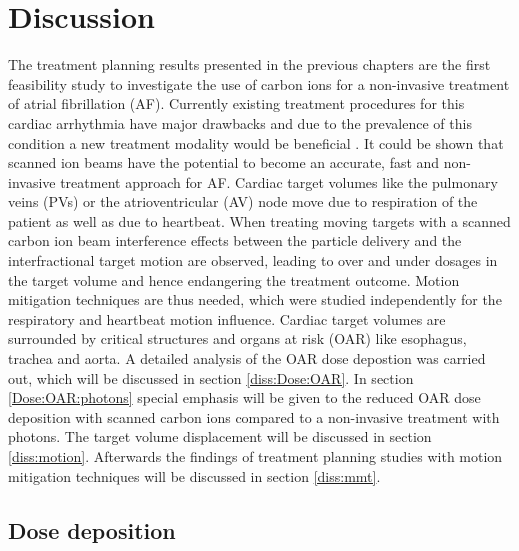 

\chapter{Discussion}
\label{Discussion}
\minitoc

\vspace*{0.3cm}

The treatment planning results presented in the previous chapters are the first feasibility study to investigate the use of carbon ions 
for a non-invasive treatment of atrial fibrillation (AF). Currently existing treatment procedures for this cardiac arrhythmia have major 
drawbacks and due to the prevalence of this condition a new treatment modality would be beneficial \cite{Cap05, Cap10}. It could 
be shown that scanned ion beams have the potential to become an accurate, fast and non-invasive treatment approach for AF.\newline 
\newline
Cardiac target volumes like the pulmonary veins (PVs) or the atrioventricular (AV) node move due to respiration of the patient as well as due 
to heartbeat. When treating moving targets with a scanned carbon ion beam interference effects between the particle delivery and the 
interfractional target motion are observed, leading to over and under dosages in the target volume and hence endangering the treatment outcome. 
Motion mitigation techniques are thus needed, which were studied independently for the respiratory and heartbeat motion influence. 
Cardiac target volumes are surrounded by critical structures and organs at risk (OAR) like esophagus, trachea and aorta. 
A detailed analysis of the OAR dose depostion was carried out, which will be discussed in section \ref{diss:Dose:OAR}. In section 
\ref{Dose:OAR:photons} special emphasis will be given to the reduced OAR dose deposition with scanned carbon ions compared to a non-invasive 
treatment with photons. The target volume displacement will be discussed in section \ref{diss:motion}. Afterwards the findings of treatment 
planning studies with motion mitigation techniques will be discussed in section \ref{diss:mmt}.

\newpage

\section{Dose deposition}

